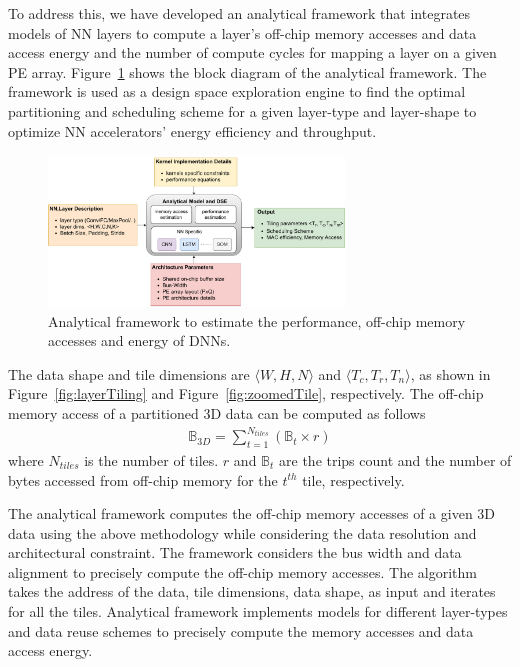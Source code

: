 \documentclass[a4paper,10pt]{article}
\newcommand{\numBytesOffChip}{\mathbb{B}}
\begin{document}
To address this, we have developed an analytical framework that integrates models of NN layers to compute a layer's off-chip memory accesses and data access energy and the number of compute cycles for mapping a layer on a given PE array. Figure~\ref{fig:analyticalModel} shows the block diagram of the analytical framework. The framework is used as a design space exploration engine to find the optimal partitioning and scheduling scheme for a given layer-type and layer-shape to optimize NN accelerators' energy efficiency and throughput. 
\begin{figure}[!htb]
	\centering
    \captionsetup{font=sf}	
	\includegraphics[width=0.7\textwidth]{analyticalModel}
	\caption{Analytical framework to estimate the performance, off-chip memory accesses and energy of DNNs.}
	\label{fig:analyticalModel}
\end{figure}
The data shape and tile dimensions are $\langle W,H,N\rangle$ and $\langle T_c,T_r,T_n\rangle$, as shown in Figure~\ref{fig:layerTiling} and Figure~\ref{fig:zoomedTile}, respectively. The off-chip memory access of a partitioned 3D data can be computed as follows
\begin{align}\label{eq:BasicOffChip3DDataAccess}
	\numBytesOffChip_{3D}{=}\sum_{t=1}^{N_{tiles}}(\numBytesOffChip_{t}{\times}r)
\end{align}
where $N_{tiles}$ is the number of tiles. $r$ and $\numBytesOffChip_{t}$ are the trips count and the number of bytes accessed from off-chip memory for the $t^{th}$ tile, respectively. 

The analytical framework computes the off-chip memory accesses of a given 3D data using the above methodology while considering the data resolution and architectural constraint. The framework considers the bus width and data alignment to precisely compute the off-chip memory accesses. The algorithm takes the
address of the data, tile dimensions, data shape, as input and iterates for all the tiles. Analytical framework implements models for different layer-types and data reuse schemes to precisely compute the memory accesses and data access energy. 
\end{document}
